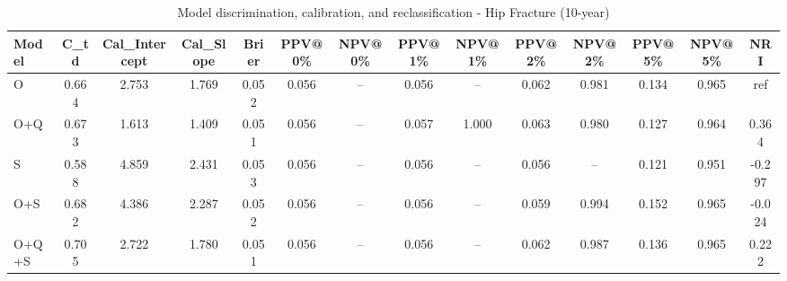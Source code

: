 \begin{table}[htbp]
\centering
\small
\caption{Model discrimination, calibration, and reclassification - Hip Fracture (10-year)}
\label{tab:perf_pd_10y}
\begin{tabular}{lccccccccccccc}
\toprule
Model & C\_td & Cal\_Intercept & Cal\_Slope & Brier & PPV@0\% & NPV@0\% & PPV@1\% & NPV@1\% & PPV@2\% & NPV@2\% & PPV@5\% & NPV@5\% & NRI \\
\midrule
O & 0.664 & 2.753 & 1.769 & 0.052 & 0.056 & -- & 0.056 & -- & 0.062 & 0.981 & 0.134 & 0.965 & ref \\
O+Q & 0.673 & 1.613 & 1.409 & 0.051 & 0.056 & -- & 0.057 & 1.000 & 0.063 & 0.980 & 0.127 & 0.964 & 0.364 \\
S & 0.588 & 4.859 & 2.431 & 0.053 & 0.056 & -- & 0.056 & -- & 0.056 & -- & 0.121 & 0.951 & -0.297 \\
O+S & 0.682 & 4.386 & 2.287 & 0.052 & 0.056 & -- & 0.056 & -- & 0.059 & 0.994 & 0.152 & 0.965 & -0.024 \\
O+Q+S & 0.705 & 2.722 & 1.780 & 0.051 & 0.056 & -- & 0.056 & -- & 0.062 & 0.987 & 0.136 & 0.965 & 0.222 \\
\bottomrule
\end{tabular}
\end{table}